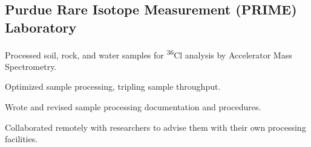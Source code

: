 \documentclass[letterpaper]{deedy-resume} %
\begin{document}
\begin{minipage}[t]{0.65\textwidth}
\subsection{Purdue Rare Isotope Measurement (PRIME) Laboratory}
\begin{tightitemize}
\item Processed soil, rock, and water samples for \textsuperscript{36}Cl analysis by Accelerator Mass Spectrometry.
\item Optimized sample processing, tripling sample throughput.
\item Wrote and revised sample processing documentation and procedures.
\item Collaborated remotely with researchers to advise them with their own processing facilities.
\end{tightitemize}

%

\end{minipage}
\end{document}
